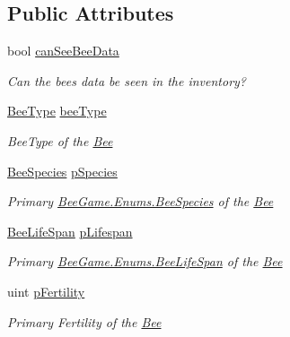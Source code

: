 \subsection*{Public Attributes}
\begin{DoxyCompactItemize}
\item 
bool \hyperlink{struct_bee_game_1_1_bee_1_1_bee_data_a9d7e31a11e286cf83d8b350557af42f7}{can\+See\+Bee\+Data}
\begin{DoxyCompactList}\small\item\em Can the bees data be seen in the inventory? \end{DoxyCompactList}\item 
\hyperlink{namespace_bee_game_1_1_enums_a9376a1582db99d20c756e24de728944f}{Bee\+Type} \hyperlink{struct_bee_game_1_1_bee_1_1_bee_data_acfb6e209ae7bd1b52928580fcce4c743}{bee\+Type}
\begin{DoxyCompactList}\small\item\em Bee\+Type of the \hyperlink{namespace_bee_game_1_1_bee}{Bee} \end{DoxyCompactList}\item 
\hyperlink{namespace_bee_game_1_1_enums_aa2ead984825678d83c42d48f6382619c}{Bee\+Species} \hyperlink{struct_bee_game_1_1_bee_1_1_bee_data_a87db9add2bcc463ab444eb4ac7a4e228}{p\+Species}
\begin{DoxyCompactList}\small\item\em Primary \hyperlink{namespace_bee_game_1_1_enums_aa2ead984825678d83c42d48f6382619c}{Bee\+Game.\+Enums.\+Bee\+Species} of the \hyperlink{namespace_bee_game_1_1_bee}{Bee} \end{DoxyCompactList}\item 
\hyperlink{namespace_bee_game_1_1_enums_ae3853807ded2f4d99a0d4a7fb4b2bc46}{Bee\+Life\+Span} \hyperlink{struct_bee_game_1_1_bee_1_1_bee_data_aa24b1efdb25e8c5592d88940f9afc1e9}{p\+Lifespan}
\begin{DoxyCompactList}\small\item\em Primary \hyperlink{namespace_bee_game_1_1_enums_ae3853807ded2f4d99a0d4a7fb4b2bc46}{Bee\+Game.\+Enums.\+Bee\+Life\+Span} of the \hyperlink{namespace_bee_game_1_1_bee}{Bee} \end{DoxyCompactList}\item 
uint \hyperlink{struct_bee_game_1_1_bee_1_1_bee_data_a12b5a0d54c6c9162a69a88c349b044d1}{p\+Fertility}
\begin{DoxyCompactList}\small\item\em Primary Fertility of the \hyperlink{namespace_bee_game_1_1_bee}{Bee} \end{DoxyCompactList}\item 

\end{DoxyCompactItemize}
